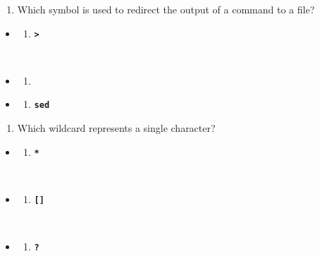 \documentclass[
  letterpaper,
  DIV=11,
  numbers=noendperiod]{scrreprt}
\providecommand{\tightlist}{%
  \setlength{\itemsep}{0pt}\setlength{\parskip}{0pt}}\usepackage{longtable,booktabs,array}
\begin{document}
\begin{enumerate}
\def\labelenumi{\arabic{enumi}.}
\setcounter{enumi}{2}
\tightlist
\item
  Which symbol is used to redirect the output of a command to a file?
\end{enumerate}

\begin{itemize}
\item
  \begin{enumerate}
  \def\labelenumi{(\Alph{enumi})}
  \tightlist
  \item
    \textbf{\texttt{\textgreater{}}}\strut \\
  \end{enumerate}
\item
  \begin{enumerate}
  \def\labelenumi{(\Alph{enumi})}
  \setcounter{enumi}{1}
  \tightlist
  \item
    \textbf{\texttt{\textbar{}}}\strut \\
  \end{enumerate}
\item
  \begin{enumerate}
  \def\labelenumi{(\Alph{enumi})}
  \setcounter{enumi}{2}
  \tightlist
  \item
    \textbf{\texttt{sed}}
  \end{enumerate}
\end{itemize}

\begin{enumerate}
\def\labelenumi{\arabic{enumi}.}
\setcounter{enumi}{3}
\tightlist
\item
  Which wildcard represents a single character?
\end{enumerate}

\begin{itemize}
\item
  \begin{enumerate}
  \def\labelenumi{(\Alph{enumi})}
  \tightlist
  \item
    \textbf{\texttt{*}}\strut \\
  \end{enumerate}
\item
  \begin{enumerate}
  \def\labelenumi{(\Alph{enumi})}
  \setcounter{enumi}{1}
  \tightlist
  \item
    \textbf{\texttt{{[}{]}}}\strut \\
  \end{enumerate}
\item
  \begin{enumerate}
  \def\labelenumi{(\Alph{enumi})}
  \setcounter{enumi}{2}
  \tightlist
  \item
    \textbf{\texttt{?}}
  \end{enumerate}
\end{itemize}
\end{document}
